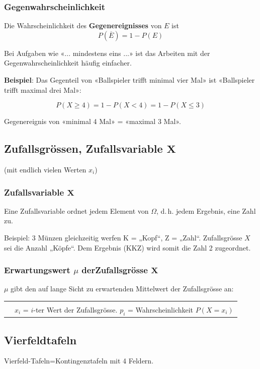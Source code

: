 \begin{multicols}{2}
\subsubsection*{Gegenwahrscheinlichkeit}
Die Wahrscheinlichkeit des \textbf{Gegenereignisses} von $E$ ist
$$P(\overline{E}) = 1- P(E)$$

Bei Aufgaben wie «... mindestens eins ...» ist das Arbeiten mit der
Gegenwahrscheinlichkeit häufig einfacher.

\textbf{Beispiel}: Das Gegenteil von «Ballspieler trifft minimal vier Mal»
ist «Ballspieler trifft maximal drei Mal»:

$$P(X \ge 4) = 1 - P(X < 4) = 1-P(X\le 3)$$

Gegenereignis von «minimal 4 Mal» = «maximal 3 Mal».

\keinHeaderUndKeinFooter{}

\subsection*{Zufallsgrössen, Zufallsvariable $\mathbf{X}$}
\keinHeaderUndKeinFooter{}

(mit endlich vielen Werten $x_i$)

\subsubsection*{Zufallsvariable $\mathbf{X}$}

Eine Zufallsvariable ordnet jedem Element von $\Omega$, d.\,h. jedem
Ergebnis, eine Zahl zu.

Beispiel: 3 Münzen gleichzeitig werfen K = „Kopf“, Z = „Zahl“.
Zufallsgrösse $X$ sei \zB die Anzahl „Köpfe“.
Dem Ergebnis (KKZ) wird somit die Zahl 2 zugeordnet.

\subsubsection*{Erwartungswert $\mu$ derZufallsgrösse $\mathbf{X}$}
$\mu$ gibt den auf lange Sicht zu erwartenden Mittelwert der
Zufallsgrösse an:

\begin{tabular}{cp{5cm}}
\hline\\
\raisebox{-4mm}{\fbox{$\mu=\sum\limits_{i=1}^n x_i\cdot{}p_i$}} & $x_i$ = $i$-ter Wert der
Zufallsgrösse. $p_i$ = Wahrscheinlichkeit  $P(X=x_i)$\\
 \hline
 \end{tabular}


\subsection*{Vierfeldtafeln}
Vierfeld-Tafeln=Kontingenztafeln mit 4 Feldern.


\end{multicols}
